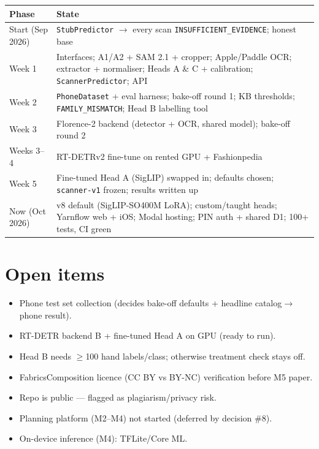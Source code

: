 \documentclass[11pt,a4paper]{article}
\begin{document}
\begin{table}[h]
\centering
\small
\begin{tabular}{ll}
\toprule
Phase & State \\
\midrule
Start (Sep 2026) & \texttt{StubPredictor} $\to$ every scan \texttt{INSUFFICIENT\_EVIDENCE}; honest base \\
Week 1 & Interfaces; A1/A2 + SAM 2.1 + cropper; Apple/Paddle OCR; extractor + normaliser; Heads A \& C + calibration; \texttt{ScannerPredictor}; API \\
Week 2 & \texttt{PhoneDataset} + eval harness; bake-off round 1; KB thresholds; \texttt{FAMILY\_MISMATCH}; Head B labelling tool \\
Week 3 & Florence-2 backend (detector + OCR, shared model); bake-off round 2 \\
Weeks 3--4 & RT-DETRv2 fine-tune on rented GPU + Fashionpedia \\
Week 5 & Fine-tuned Head A (SigLIP) swapped in; defaults chosen; \texttt{scanner-v1} frozen; results written up \\
Now (Oct 2026) & v8 default (SigLIP-SO400M LoRA); custom/taught heads; Yarnflow web + iOS; Modal hosting; PIN auth + shared D1; 100+ tests, CI green \\
\bottomrule
\end{tabular}
\end{table}

\section{Open items}

\begin{itemize}[leftmargin=*]
  \item Phone test set collection (decides bake-off defaults + headline catalog$\to$phone result).
  \item RT-DETR backend B + fine-tuned Head A on GPU (ready to run).
  \item Head B needs $\ge$100 hand labels/class; otherwise treatment check stays off.
  \item FabricsComposition licence (CC BY vs BY-NC) verification before M5 paper.
  \item Repo is public --- flagged as plagiarism/privacy risk.
  \item Planning platform (M2--M4) not started (deferred by decision \#8).
  \item On-device inference (M4): TFLite/Core ML.
\end{itemize}
\end{document}
